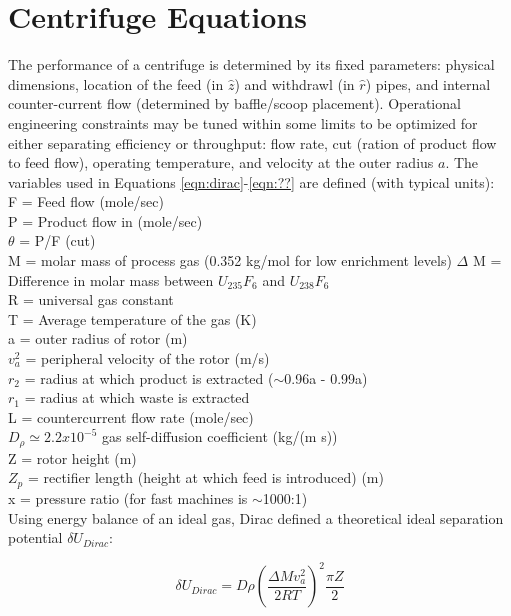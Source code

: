 \section{Centrifuge Equations}
The performance of a centrifuge is determined by its fixed parameters: physical dimensions, location of the feed (in $\hat{z}$) and withdrawl (in $\hat{r}$) pipes, and internal counter-current flow (determined by baffle/scoop placement). Operational engineering constraints may be tuned within some limits to be optimized for either separating efficiency or throughput: flow rate, cut (ration of product flow to feed flow), operating temperature, and velocity at the outer radius $a$. The variables used in Equations \ref{eqn:dirac}-\ref{eqn:??} are defined (with typical units):
\\
F = Feed flow (mole/sec) \\
P = Product flow in (mole/sec)\\
$\theta$ = P/F (cut)\\
M = molar mass of process gas (0.352 kg/mol for low enrichment levels)
$\Delta$ M = Difference in molar mass between $U_{235}F_{6}$ and $U_{238}F_{6}$\\
R = universal gas constant\\
T = Average temperature of the gas (K)\\
a = outer radius of rotor (m) \\
$v_{a}^{2}$ = peripheral velocity of the rotor (m/s)\\
$r_{2}$ = radius at which product is extracted ($\sim$0.96a - 0.99a)\\
$r_{1}$ = radius at which waste is extracted \\
L = countercurrent flow rate (mole/sec) \\
$D_{\rho} \simeq 2.2x10^{-5}$ gas self-diffusion coefficient (kg/(m s)) \\
Z = rotor height (m)  \\
$Z_{p}$ = rectifier length (height at which feed is introduced) (m) \\
x = pressure ratio (for fast machines is $\sim$1000:1) 
\\

Using energy balance of an ideal gas, Dirac defined a theoretical ideal separation potential $\delta U_{Dirac}$: 

\begin{equation}
  \label{eqn:dirac}
  \delta U_{Dirac} = D\rho \left ( \frac{\Delta M v_{a}^{2}}{2RT} \right )^{2} \frac{\pi Z}{2}
  \end{equation}

